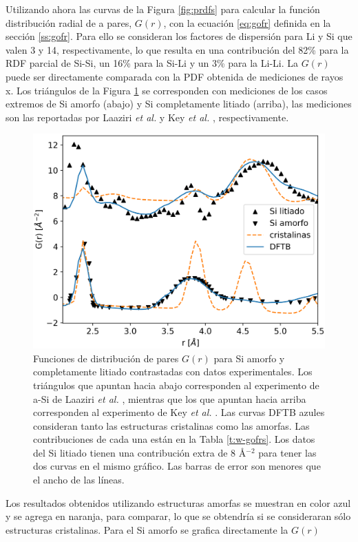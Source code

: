 Utilizando ahora las curvas de la Figura \ref{fig:prdfs} para calcular la función
distribución radial de a pares, $G(r)$, con la ecuación \ref{eq:gofr} definida 
en la sección \ref{ss:gofr}. Para ello se consideran los factores de 
dispersión para Li y Si que valen 3 y 14, respectivamente, lo que resulta en una 
contribución del 82\% para la RDF parcial de Si-Si, un 16\% para la Si-Li y
un 3\% para la Li-Li. La $G(r)$ puede ser directamente comparada con la PDF
obtenida de mediciones de rayos x. Los triángulos de la Figura \ref{fig:pdfs} 
se corresponden con mediciones de los casos extremos de Si amorfo (abajo) y
Si completamente litiado (arriba), las mediciones son las reportadas por Laaziri 
\textit{et al.} \cite{laaziri1999} y Key \textit{et al.} \cite{key2011}, respectivamente.
\begin{figure}[h!]
    \centering
    \includegraphics[width=.7\textwidth]{Silicio/prediccion/resultados/xray/pdfs.png}
    \caption{Funciones de distribución de pares $G(r)$ para Si amorfo y 
    completamente litiado contrastadas con datos experimentales. Los triángulos 
    que apuntan hacia abajo corresponden al experimento de a-Si de Laaziri 
    \textit{et al.} \cite{laaziri1999}, mientras que los que apuntan hacia arriba 
    corresponden al experimento de Key \textit{et al.} \cite{key2011}. Las curvas 
    DFTB azules consideran tanto las estructuras cristalinas como las amorfas. Las 
    contribuciones de cada una están en la Tabla  \ref{t:w-gofrs}. Los datos del Si 
    litiado tienen una contribución extra de 8 \AA$^{-2}$ para tener las dos curvas 
    en el mismo gráfico. Las barras de error son menores que el ancho de las líneas.}
    \label{fig:pdfs}
\end{figure}
Los resultados obtenidos utilizando estructuras amorfas se muestran en color azul 
y se agrega en naranja, para comparar, lo que se obtendría si se consideraran sólo
estructuras cristalinas. Para el Si amorfo se grafica directamente la $G(r)$ 
